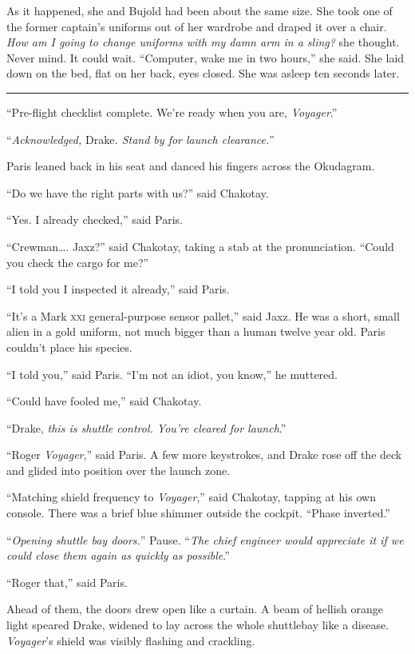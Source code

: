 \documentclass[twoside,letterpaper,12pt]{memoir}
\begin{document}
As it happened, she and Bujold had been about the same size. She took one of the former captain's uniforms out of her wardrobe and draped it over a chair. \textit{How am I going to change uniforms with my damn arm in a sling?} she thought. Never mind. It could wait. ``Computer, wake me in two hours,'' she said. She laid down on the bed, flat on her back, eyes closed. She was asleep ten seconds later.

\fancybreak{\rule{3cm}{0.4 pt}}
``Pre-flight checklist complete. We're ready when you are, \textit{Voyager}.''

``\textit{Acknowledged, }Drake\textit{. Stand by for launch clearance.}''

Paris leaned back in his seat and danced his fingers across the Okudagram.

``Do we have the right parts with us?'' said Chakotay.

``Yes. I already checked,'' said Paris.

``Crewman\ldots . Jaxz?'' said Chakotay, taking a stab at the pronunciation. ``Could you check the cargo for me?''

``I told you I inspected it already,'' said Paris.

``It's a Mark \textsc{xxi} general-purpose sensor pallet,'' said Jaxz. He was a short, small alien in a gold uniform, not much bigger than a human twelve year old. Paris couldn't place his species.

``I told you,'' said Paris. ``I'm not an idiot, you know,'' he muttered.

``Could have fooled me,'' said Chakotay.

``Drake, \textit{this is shuttle control. You're cleared for launch}.''

``Roger \textit{Voyager},'' said Paris. A few more keystrokes, and Drake rose off the deck and glided into position over the launch zone.

``Matching shield frequency to \textit{Voyager},'' said Chakotay, tapping at his own console. There was a brief blue shimmer outside the cockpit. ``Phase inverted.''

``\textit{Opening shuttle bay doors.}'' Pause. ``\textit{The chief engineer would appreciate it if we could close them again as quickly as possible}.''

``Roger that,'' said Paris.

Ahead of them, the doors drew open like a curtain. A beam of hellish orange light speared Drake, widened to lay across the whole shuttlebay like a disease. \textit{Voyager}'s shield was visibly flashing and crackling.
\end{document}
